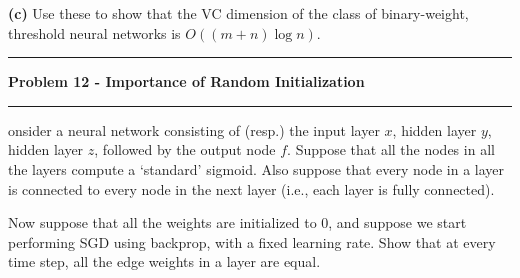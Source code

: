 \documentclass[11pt]{article}
\newcommand\question[2]{\vspace{.25in}\hrule\textbf{#1}\vspace{.5em}\hrule\vspace{.10in}}
\renewcommand\part[1]{\vspace{.10in}\textbf{(#1)}}
\begin{document}
\part{c} Use these to show that the VC dimension of the class of binary-weight, threshold neural networks is $O((m+n)\log ⁡n)$.


\question{Problem 12 - Importance of Random Initialization}

Consider a neural network consisting of (resp.) the input layer $x$, hidden layer $y$, hidden layer $z$, followed by the output node $f$. Suppose that all the nodes in all the layers compute a `standard' sigmoid. Also suppose that every node in a layer is connected to every node in the next layer (i.e., each layer is fully connected).

Now suppose that all the weights are initialized to 0, and suppose we start performing SGD using backprop, with a fixed learning rate. Show that at every time step, all the edge weights in a layer are equal.
\end{document}
